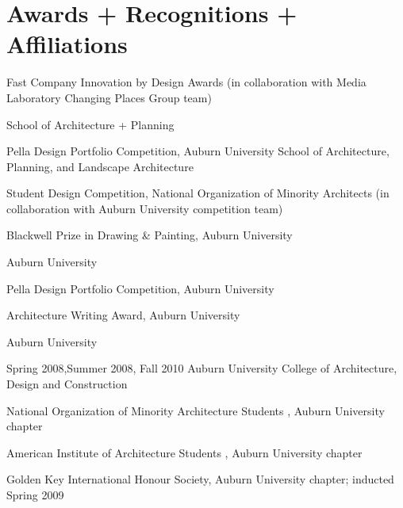 \documentclass[letterpaper, oneside, 10pt]{article}
\begin{document}
\section*{Awards + Recognitions + Affiliations} %

\DotSep{0.25em} Fast Company Innovation
by Design Awards (in collaboration with  Media Laboratory Changing
Places Group team)

\DotSep{0.25em}  School of
Architecture + Planning 

\DotSep{0.25em} Pella Design Portfolio
Competition, Auburn University School of Architecture, Planning, and Landscape
Architecture 

\DotSep{0.25em} Student Design Competition,
National Organization of Minority Architects (in collaboration with Auburn
University  competition team)

\DotSep{0.25em} Blackwell Prize in Drawing \&
Painting, Auburn University 

\DotSep{0.25em} Auburn University 

\DotSep{0.25em} Pella Design Portfolio
Competition, Auburn University 

\DotSep{0.25em} Architecture Writing Award, Auburn
University 

\DotSep{0.25em}
Auburn University 

\DotSep{0.25em} Spring 2008,\enspace Summer 2008,\enspace
Fall 2010\DotSep{0.25em} Auburn University College of Architecture, Design and
Construction 

\hfill
\vspace{-15pt}

\DotSep{0.25em} National Organization of Minority
Architecture Students , Auburn University chapter

\DotSep{0.25em}
American Institute of Architecture Students , Auburn University
chapter

 \DotSep{0.25em} Golden Key International Honour Society, Auburn
University chapter; inducted Spring 2009
\end{document}
